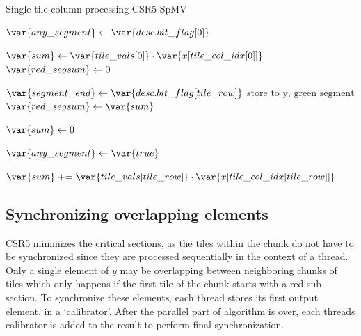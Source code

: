 \documentclass[thesis=M,english]{FITthesis}[2019/12/23]
\newcommand{\pluseq}{\mathrel{+}=}
\begin{document}
\begin{algorithm}[h]
    \caption{Single tile column processing CSR5 SpMV}\label{csr5:spmv:single_tile}
    \begin{algorithmic}

        \State $\var{any\_segment} \gets \var{desc.bit\_flag[0]}$

        \State $\var{sum} \gets \var{tile\_vals[0]} \cdot \var{x[tile\_col\_idx[0]]}$
        \State $\var{red\_segsum} \gets 0$

        \State $\var{segment\_end} \gets \var{desc.bit\_flag[tile\_row]}$
        \State $\text{store to y, green segment}$
        \Else
        \State $\var{red\_segsum} \gets \var{sum}$
        \EndIf

        \State $\var{sum} \gets 0$

        \State $\var{any\_segment} \gets \var{true}$
        \EndIf

        \State $\var{sum} \pluseq \var{tile\_vals[tile\_row]} \cdot \var{x[tile\_col\_idx[tile\_row]]}$
        \EndFor
        \State ${}$ 
        \EndFunction
    \end{algorithmic}
\end{algorithm}


\subsection{Synchronizing overlapping elements}

CSR5 minimizes the critical sections, as the tiles within the chunk do not have to be
synchronized since they are processed sequentially in the context of a thread. Only a single element of
\(y\) may be overlapping between neighboring chunks of tiles which only happens if the first tile of the
chunk starts with a red sub-section. To synchronize these elements, each thread
stores its first output element, in a `calibrator'. After the parallel part of algorithm is over, each
threads calibrator is added to the result to perform final synchronization.
\end{document}
